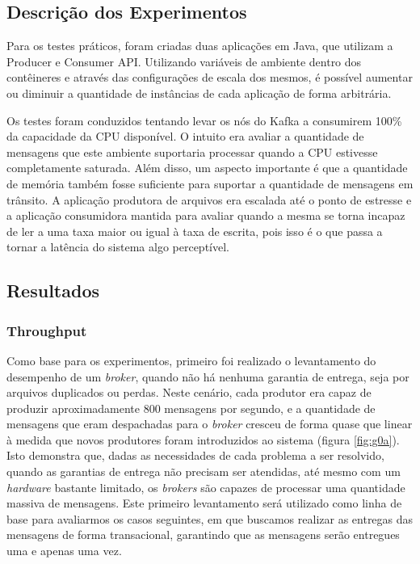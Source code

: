 \documentclass[12pt]{article}
\begin{document}
\subsection{Descrição dos Experimentos}
Para os testes práticos, foram criadas duas aplicações em Java, que utilizam a Producer e Consumer API. Utilizando variáveis de ambiente dentro dos contêineres e através das configurações de escala dos mesmos, é possível aumentar ou diminuir a quantidade de instâncias de cada aplicação de forma arbitrária.

Os testes foram conduzidos tentando levar os nós do Kafka a consumirem 100\% da capacidade da CPU disponível. O intuito era avaliar a quantidade de mensagens que este ambiente suportaria processar quando a CPU estivesse completamente saturada. Além disso, um aspecto importante é que a quantidade de memória também fosse suficiente para suportar a quantidade de mensagens em trânsito. A aplicação produtora de arquivos era escalada até o ponto de estresse e a aplicação consumidora mantida para avaliar quando a mesma se torna incapaz de ler a uma taxa maior ou igual à taxa de escrita, pois isso é o que passa a tornar a latência do sistema algo perceptível.

\subsection{Resultados}

\subsubsection{Throughput}

Como base para os experimentos, primeiro foi realizado o levantamento do desempenho de um \textit{broker}, quando não há nenhuma garantia de entrega, seja por arquivos duplicados ou perdas. Neste cenário, cada produtor era capaz de produzir aproximadamente 800 mensagens por segundo, e a quantidade de mensagens que eram despachadas para o \textit{broker} cresceu de forma quase que linear à medida que novos produtores foram introduzidos ao sistema (figura \ref{fig:g0a}). Isto demonstra que, dadas as necessidades de cada problema a ser resolvido, quando as garantias de entrega não precisam ser atendidas, até mesmo com um \textit{hardware} bastante limitado, os \textit{brokers} são capazes de processar uma quantidade massiva de mensagens. Este primeiro levantamento será utilizado como linha de base para avaliarmos os casos seguintes, em que buscamos realizar as entregas das mensagens de forma transacional, garantindo que as mensagens serão entregues uma e apenas uma vez.
\end{document}
